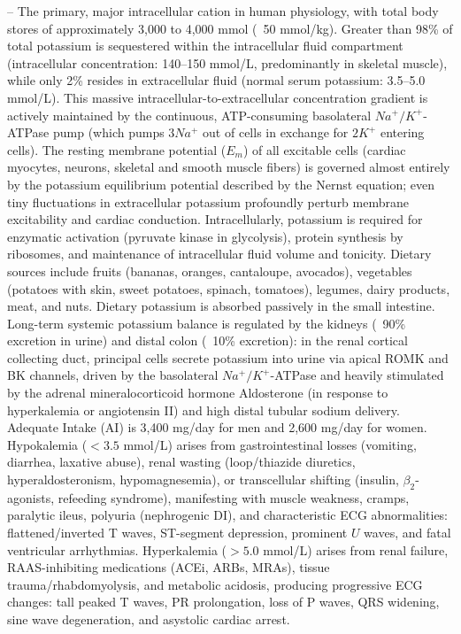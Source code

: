 -- The primary, major intracellular cation in human physiology, with total body stores of approximately 3,000 to 4,000 mmol (~50 mmol/kg). Greater than 98\% of total potassium is sequestered within the intracellular fluid compartment (intracellular concentration: 140--150 mmol/L, predominantly in skeletal muscle), while only 2\% resides in extracellular fluid (normal serum potassium: 3.5--5.0 mmol/L). This massive intracellular-to-extracellular concentration gradient is actively maintained by the continuous, ATP-consuming basolateral $Na^+/K^+$-ATPase pump (which pumps $3Na^+$ out of cells in exchange for $2K^+$ entering cells). The resting membrane potential ($E_m$) of all excitable cells (cardiac myocytes, neurons, skeletal and smooth muscle fibers) is governed almost entirely by the potassium equilibrium potential described by the Nernst equation; even tiny fluctuations in extracellular potassium profoundly perturb membrane excitability and cardiac conduction. Intracellularly, potassium is required for enzymatic activation (pyruvate kinase in glycolysis), protein synthesis by ribosomes, and maintenance of intracellular fluid volume and tonicity. Dietary sources include fruits (bananas, oranges, cantaloupe, avocados), vegetables (potatoes with skin, sweet potatoes, spinach, tomatoes), legumes, dairy products, meat, and nuts. Dietary potassium is absorbed passively in the small intestine. Long-term systemic potassium balance is regulated by the kidneys (~90\% excretion in urine) and distal colon (~10\% excretion): in the renal cortical collecting duct, principal cells secrete potassium into urine via apical ROMK and BK channels, driven by the basolateral $Na^+/K^+$-ATPase and heavily stimulated by the adrenal mineralocorticoid hormone Aldosterone (in response to hyperkalemia or angiotensin II) and high distal tubular sodium delivery. Adequate Intake (AI) is 3,400 mg/day for men and 2,600 mg/day for women. Hypokalemia ($<3.5$ mmol/L) arises from gastrointestinal losses (vomiting, diarrhea, laxative abuse), renal wasting (loop/thiazide diuretics, hyperaldosteronism, hypomagnesemia), or transcellular shifting (insulin, $\beta_2$-agonists, refeeding syndrome), manifesting with muscle weakness, cramps, paralytic ileus, polyuria (nephrogenic DI), and characteristic ECG abnormalities: flattened/inverted T waves, ST-segment depression, prominent $U$ waves, and fatal ventricular arrhythmias. Hyperkalemia ($>5.0$ mmol/L) arises from renal failure, RAAS-inhibiting medications (ACEi, ARBs, MRAs), tissue trauma/rhabdomyolysis, and metabolic acidosis, producing progressive ECG changes: tall peaked T waves, PR prolongation, loss of P waves, QRS widening, sine wave degeneration, and asystolic cardiac arrest.

